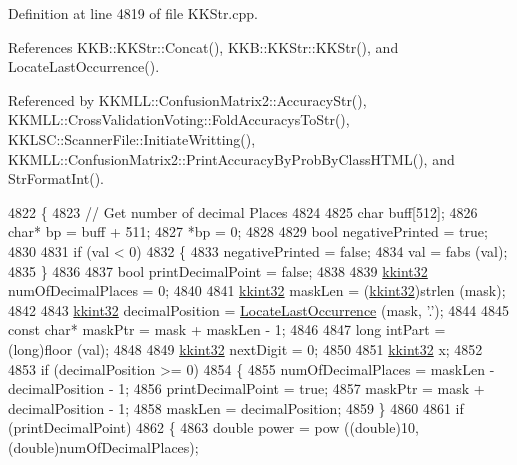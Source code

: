 Definition at line 4819 of file K\+K\+Str.\+cpp.



References K\+K\+B\+::\+K\+K\+Str\+::\+Concat(), K\+K\+B\+::\+K\+K\+Str\+::\+K\+K\+Str(), and Locate\+Last\+Occurrence().



Referenced by K\+K\+M\+L\+L\+::\+Confusion\+Matrix2\+::\+Accuracy\+Str(), K\+K\+M\+L\+L\+::\+Cross\+Validation\+Voting\+::\+Fold\+Accuracys\+To\+Str(), K\+K\+L\+S\+C\+::\+Scanner\+File\+::\+Initiate\+Writting(), K\+K\+M\+L\+L\+::\+Confusion\+Matrix2\+::\+Print\+Accuracy\+By\+Prob\+By\+Class\+H\+T\+M\+L(), and Str\+Format\+Int().


\begin{DoxyCode}
4822 \{
4823   \textcolor{comment}{// Get number of decimal Places}
4824 
4825   \textcolor{keywordtype}{char}  buff[512];
4826   \textcolor{keywordtype}{char}* bp = buff + 511;
4827   *bp = 0;
4828 
4829   \textcolor{keywordtype}{bool}  negativePrinted = \textcolor{keyword}{true};
4830 
4831   \textcolor{keywordflow}{if}  (val < 0)
4832   \{
4833     negativePrinted = \textcolor{keyword}{false};
4834     val = fabs (val);
4835   \}
4836 
4837   \textcolor{keywordtype}{bool}    printDecimalPoint = \textcolor{keyword}{false};
4838 
4839   \hyperlink{namespace_k_k_b_a8fa4952cc84fda1de4bec1fbdd8d5b1b}{kkint32} numOfDecimalPlaces = 0;
4840 
4841   \hyperlink{namespace_k_k_b_a8fa4952cc84fda1de4bec1fbdd8d5b1b}{kkint32} maskLen = (\hyperlink{namespace_k_k_b_a8fa4952cc84fda1de4bec1fbdd8d5b1b}{kkint32})strlen (mask);
4842   
4843   \hyperlink{namespace_k_k_b_a8fa4952cc84fda1de4bec1fbdd8d5b1b}{kkint32} decimalPosition = \hyperlink{_k_k_str_8cpp_aa766b7b69605ce6e40681204eb750ab6}{LocateLastOccurrence} (mask, \textcolor{charliteral}{'.'});
4844 
4845   \textcolor{keyword}{const} \textcolor{keywordtype}{char}*  maskPtr = mask + maskLen - 1; 
4846 
4847   \textcolor{keywordtype}{long}  intPart = (long)floor (val);
4848 
4849   \hyperlink{namespace_k_k_b_a8fa4952cc84fda1de4bec1fbdd8d5b1b}{kkint32}  nextDigit = 0;
4850 
4851   \hyperlink{namespace_k_k_b_a8fa4952cc84fda1de4bec1fbdd8d5b1b}{kkint32}  x;
4852 
4853   \textcolor{keywordflow}{if}  (decimalPosition >= 0)
4854   \{
4855     numOfDecimalPlaces = maskLen - decimalPosition - 1;
4856     printDecimalPoint = \textcolor{keyword}{true};
4857     maskPtr = mask + decimalPosition - 1;
4858     maskLen = decimalPosition;
4859   \}
4860 
4861   \textcolor{keywordflow}{if}  (printDecimalPoint)
4862   \{
4863     \textcolor{keywordtype}{double}  power = pow ((\textcolor{keywordtype}{double})10, (\textcolor{keywordtype}{double})numOfDecimalPlaces);

\end{DoxyCode}
